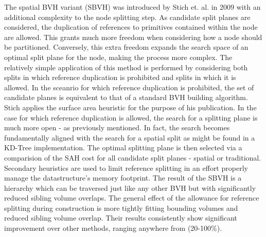 \documentclass[12pt, a4paper]{article}
\begin{document}
The spatial BVH variant (SBVH) was introduced by Stich et. al. in 2009 \cite{Stich_2009} with an additional complexity to the node splitting step. As candidate split planes are considered, the duplication of references to primitives contained within the node are allowed. This grants much more freedom when considering how a node should be partitioned. Conversely, this extra freedom expands the search space of an optimal split plane for the node, making the process more complex. The relatively simple application of this method is performed by considering both splits in which reference duplication is prohibited and splits in which it is allowed. In the sceanrio for which reference duplication is prohibited, the set of candidate planes is equivalent to that of a standard BVH building algorithm. Stich applies the surface area heuristic for the purpose of his publication. In the case for which reference duplication is allowed, the search for a splitting plane is much more open - as previously mentioned. In fact, the search becomes fundamentally aligned with the search for a spatial split as might be found in a KD-Tree implementation. The optimal splitting plane is then selected via a comparision of the SAH cost for all candidate split planes - spatial or traditional. Secondary heuristics are used to limit reference splitting in an effort properly manage the datastructure's memory footprint. The result of the SBVH is a hierarchy which can be traversed just like any other BVH but with significantly reduced sibling volume overlaps. The general effect of the allowance for reference splitting during construction is more tightly fitting bounding volumes and reduced sibling volume overlap. Their results consistently show significant improvement over other methods, ranging anywhere from (20-100\%).\cite{Stich_2009}

\end{document}
